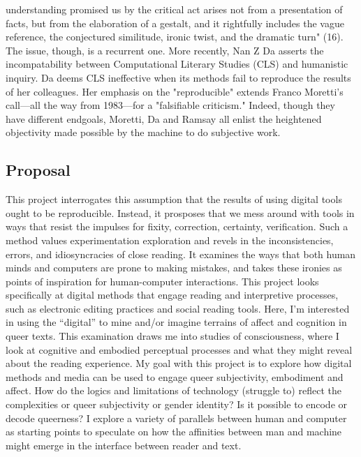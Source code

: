 \documentclass[11pt]{article}
\begin{document}
understanding promised us by the critical act arises not from a
presentation of facts, but from the elaboration of a gestalt, and it
rightfully includes the vague reference, the conjectured similitude,
ironic twist, and the dramatic turn" (16). The issue, though, is a
recurrent one. More recently, Nan Z Da asserts the incompatability
between Computational Literary Studies (CLS) and humanistic
inquiry. Da deems CLS ineffective when its methods fail to reproduce
the results of her colleagues. Her emphasis on the "reproducible"
extends Franco Moretti's call---all the way from 1983---for a
"falsifiable criticism." Indeed, though they have different endgoals,
Moretti, Da and Ramsay all enlist the heightened objectivity made
possible by the machine to do subjective work.

\subsection{Proposal}
\label{sec:orgaa4f168}
This project interrogates this assumption that the results of using
digital tools ought to be reproducible. Instead, it prosposes that we
mess around with tools in ways that resist the impulses for fixity,
correction, certainty, verification. Such a method values
experimentation exploration and revels in the inconsistencies, errors,
and idiosyncracies of close reading. It examines the ways that both
human minds and computers are prone to making mistakes, and takes
these ironies as points of inspiration for human-computer
interactions. This project looks specifically at digital methods that
engage reading and interpretive processes, such as electronic editing
practices and social reading tools. Here, I’m interested in using the
“digital” to mine and/or imagine terrains of affect and cognition in
queer texts. This examination draws me into studies of consciousness,
where I look at cognitive and embodied perceptual processes and what
they might reveal about the reading experience. My goal with this
project is to explore how digital methods and media can be used to
engage queer subjectivity, embodiment and affect. How do the logics
and limitations of technology (struggle to) reflect the complexities
or queer subjectivity or gender identity? Is it possible to encode or
decode queerness? I explore a variety of parallels between human and
computer as starting points to speculate on how the affinities between
man and machine might emerge in the interface between reader and text.
\end{document}
